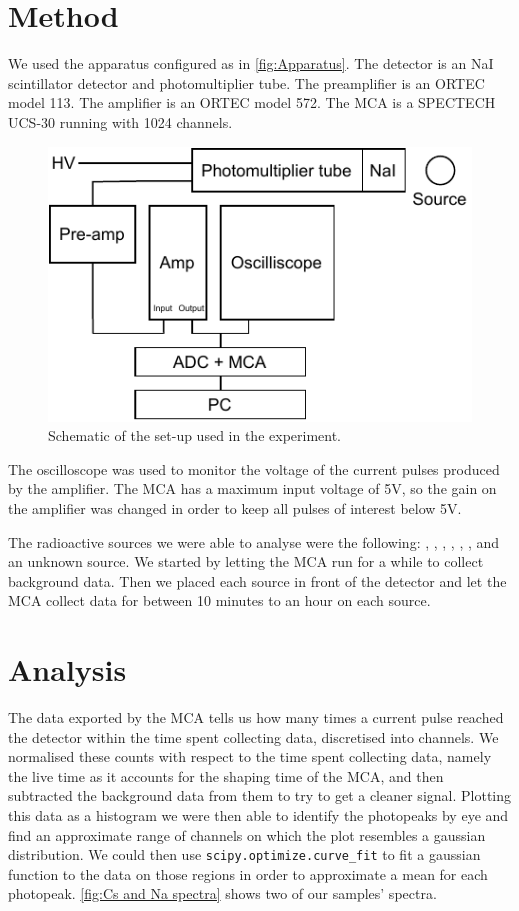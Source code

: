 \documentclass[11pt]{article}
\numberwithin{equation}{section}
\numberwithin{figure}{section}
\numberwithin{table}{section}
\begin{document}
    \section{Method}\label{sec:Method}
    \par We used the apparatus configured as in \autoref{fig:Apparatus}. The detector is an NaI scintillator detector and photomultiplier tube. The preamplifier is an ORTEC model 113. The amplifier is an ORTEC model 572. The MCA is a SPECTECH UCS-30 running with 1024 channels. 
    \begin{figure}
        \includegraphics{apparatus.pdf}
        \caption{Schematic of the set-up used in the experiment.}
        \label{fig:Apparatus}
    \end{figure}
    \par The oscilloscope was used to monitor the voltage of the current pulses produced by the amplifier. The MCA has a maximum input voltage of 5V, so the gain on the amplifier was changed in order to keep all pulses of interest below 5V. 
    \par The radioactive sources we were able to analyse were the following: , , , , , , and an unknown source. We started by letting the MCA run for a while to collect background data. Then we placed each source in front of the detector and let the MCA collect data for between 10 minutes to an hour on each source. 

    \section{Analysis}\label{sec:Analysis}
    \par The data exported by the MCA tells us how many times a current pulse reached the detector within the time spent collecting data, discretised into channels. We normalised these counts with respect to the time spent collecting data, namely the live time as it accounts for the shaping time of the MCA, and then subtracted the background data from them to try to get a cleaner signal. Plotting this data as a histogram we were then able to identify the photopeaks by eye and find an approximate range of channels on which the plot resembles a gaussian distribution. We could then use \texttt{scipy.optimize.curve\_fit} to fit a gaussian function to the data on those regions in order to approximate a mean for each photopeak. \autoref{fig:Cs and Na spectra} shows two of our samples' spectra. 
\end{document}
